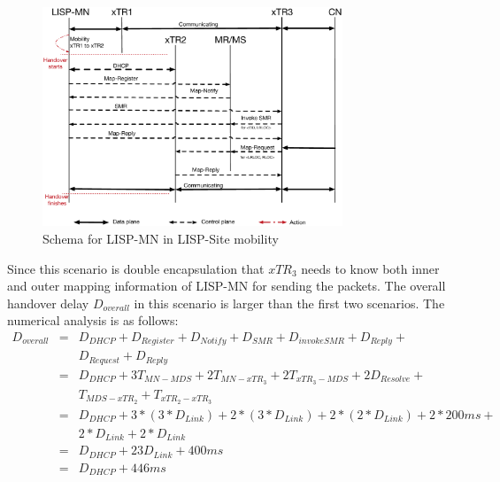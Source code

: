 \begin{figure}[!th]
	\centering
	\includegraphics[width=0.8\textwidth]{Pics/Mobility_double_encap_schema_SMR_askMDS_simplify}
	\caption{Schema for LISP-MN in LISP-Site mobility}
	\label{Mobility_double_encap_schema_SMR_askMDS_simplify}
\end{figure}

Since this scenario is double encapsulation that $xTR_3$ needs to know both inner and outer mapping information of LISP-MN for sending the packets. The overall handover delay $D_{overall}$ in this scenario is larger than the first two scenarios. The numerical analysis is as follows:
\begin{eqnarray}
D_{overall} &=& D_{DHCP} + D_{Register} + D_{Notify} + D_{SMR} + D_{invokeSMR} + D_{Reply} +  \nonumber \\
& & D_{Request}+ D_{Reply} \nonumber \\
&=& D_{DHCP} + 3T_{MN-MDS} + 2T_{MN-xTR_3} + 2T_{xTR_3-MDS} + 2D_{Resolve} +   \nonumber \\
& & T_{MDS-xTR_2} + T_{xTR_2-xTR_3}   \nonumber \\
&=& D_{DHCP} + 3* (3*D_{Link}) + 2*(3*D_{Link}) + 2*(2*D_{Link}) + 2*200ms +  \nonumber \\
& & 2*D_{Link} + 2*D_{Link} \nonumber \\
&=& D_{DHCP} + 23D_{Link} + 400 ms  \\
&=& D_{DHCP} + 446 ms \nonumber
\end{eqnarray}

